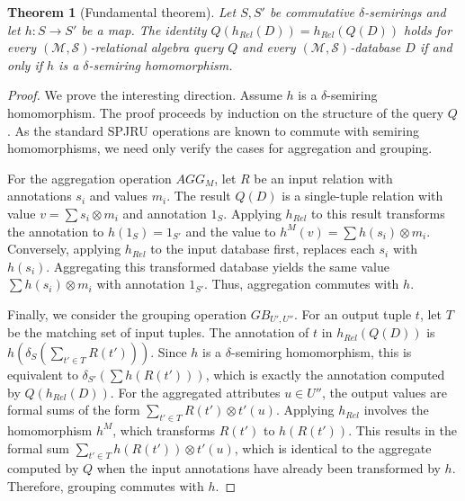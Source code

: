 \documentclass[oneside, 11pt]{amsbook}
\theoremstyle{plain}
\newtheorem{thm}{Theorem}[section]
\theoremstyle{definition}
\theoremstyle{remark}
\begin{document}
\begin{thm}[Fundamental theorem]
    \label{thm:fundamentalsimpleaggregation}
    Let $S, S'$ be commutative $\delta$-semirings and let $h: S \to S'$ be a map. The identity $Q(h_{Rel}(D)) = h_{Rel}(Q(D))$ holds for every $(\mathcal{M}, \mathcal{S})$-relational algebra query $Q$ and every $(\mathcal{M}, \mathcal{S})$-database $D$ if and only if $h$ is a $\delta$-semiring homomorphism.
\end{thm}
\begin{proof}
    We prove the interesting direction. Assume $h$ is a $\delta$-semiring homomorphism. The proof proceeds by induction on the structure of the query $Q$. As the standard SPJRU operations are known to commute with semiring homomorphisms, we need only verify the cases for aggregation and grouping.

    For the aggregation operation $AGG_M$, let $R$ be an input relation with annotations $s_i$ and values $m_i$. The result $Q(D)$ is a single-tuple relation with value $v = \sum s_i \otimes m_i$ and annotation $1_S$. Applying $h_{Rel}$ to this result transforms the annotation to $h(1_S) = 1_{S'}$ and the value to $h^M(v) = \sum h(s_i) \otimes m_i$. Conversely, applying $h_{Rel}$ to the input database first, replaces each $s_i$ with $h(s_i)$. Aggregating this transformed database yields the same value $\sum h(s_i) \otimes m_i$ with annotation $1_{S'}$. Thus, aggregation commutes with $h$.

    Finally, we consider the grouping operation $GB_{U', U''}$. For an output tuple $t$, let $T$ be the matching set of input tuples. The annotation of $t$ in $h_{Rel}(Q(D))$ is $h(\delta_S(\sum_{t' \in T} R(t')))$. Since $h$ is a $\delta$-semiring homomorphism, this is equivalent to $\delta_{S'}(\sum h(R(t')))$, which is exactly the annotation computed by $Q(h_{Rel}(D))$. For the aggregated attributes $u \in U''$, the output values are formal sums of the form $\sum_{t' \in T} R(t') \otimes t'(u)$. Applying $h_{Rel}$ involves the homomorphism $h^M$, which transforms $R(t')$ to $h(R(t'))$. This results in the formal sum $\sum_{t' \in T} h(R(t')) \otimes t'(u)$, which is identical to the aggregate computed by $Q$ when the input annotations have already been transformed by $h$. Therefore, grouping commutes with $h$.
\end{proof}
\end{document}

